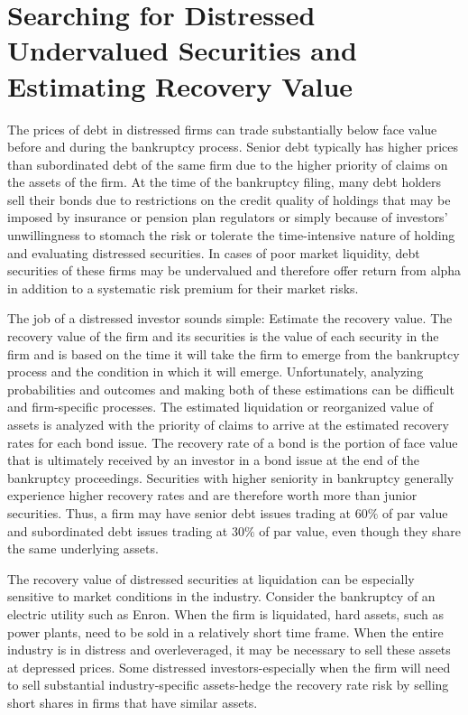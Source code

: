 \documentclass[11pt]{article}
\begin{document}
\section*{Searching for Distressed Undervalued Securities and Estimating Recovery Value}
The prices of debt in distressed firms can trade substantially below face value before and during the bankruptcy process. Senior debt typically has higher prices than subordinated debt of the same firm due to the higher priority of claims on the assets of the firm. At the time of the bankruptcy filing, many debt holders sell their bonds due to restrictions on the credit quality of holdings that may be imposed by insurance or pension plan regulators or simply because of investors' unwillingness to stomach the risk or tolerate the time-intensive nature of holding and evaluating distressed securities. In cases of poor market liquidity, debt securities of these firms may be undervalued and therefore offer return from alpha in addition to a systematic risk premium for their market risks.

The job of a distressed investor sounds simple: Estimate the recovery value. The recovery value of the firm and its securities is the value of each security in the firm and is based on the time it will take the firm to emerge from the bankruptcy process and the condition in which it will emerge. Unfortunately, analyzing probabilities and outcomes and making both of these estimations can be difficult and firm-specific processes. The estimated liquidation or reorganized value of assets is analyzed with the priority of claims to arrive at the estimated recovery rates for each bond issue. The recovery rate of a bond is the portion of face value that is ultimately received by an investor in a bond issue at the end of the bankruptcy proceedings. Securities with higher seniority in bankruptcy generally experience higher recovery rates and are therefore worth more than junior securities. Thus, a firm may have senior debt issues trading at $60 \%$ of par value and subordinated debt issues trading at $30 \%$ of par value, even though they share the same underlying assets.

The recovery value of distressed securities at liquidation can be especially sensitive to market conditions in the industry. Consider the bankruptcy of an electric utility such as Enron. When the firm is liquidated, hard assets, such as power plants, need to be sold in a relatively short time frame. When the entire industry is in distress and overleveraged, it may be necessary to sell these assets at depressed prices. Some distressed investors-especially when the firm will need to sell substantial industry-specific assets-hedge the recovery rate risk by selling short shares in firms that have similar assets.
\end{document}
